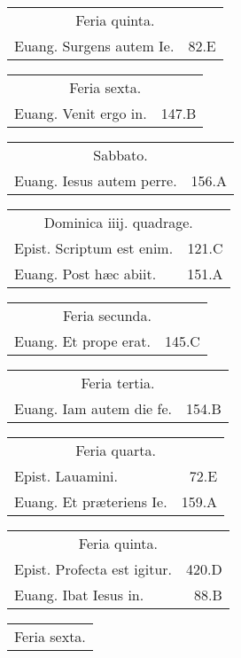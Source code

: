 \documentclass[a5paper,10pt]{book}
\def\ae{æ}
\begin{document}
\begin{multicols}{2}
\begin{tabular}{l r}
\end{tabular}
\begin{tabular}{l r}
\multicolumn{2}{c}{\color{red} Feria quinta.}\\
Euang. Surgens autem Ie. & 82.E\\
\end{tabular}
\begin{tabular}{l r}
\multicolumn{2}{c}{\color{red} Feria sexta.}\\
Euang. Venit ergo in. & 147.B\\
\end{tabular}
\begin{tabular}{l r}
\multicolumn{2}{c}{\color{red} Sabbato.}\\
Euang. Iesus autem perre. & 156.A\\
\end{tabular}
\begin{tabular}{l r}
\multicolumn{2}{c}{\color{red} Dominica iiij. quadrage.}\\
Epist. Scriptum est enim. & 121.C\\
Euang. Post h\ae c abiit. & 151.A\\
\end{tabular}
\begin{tabular}{l r}
\multicolumn{2}{c}{\color{red} Feria secunda.}\\
Euang. Et prope erat. & 145.C\\
\end{tabular}
\begin{tabular}{l r}
\multicolumn{2}{c}{\color{red} Feria tertia.}\\
Euang. Iam autem die fe. & 154.B\\
\end{tabular}
\begin{tabular}{l r}
\multicolumn{2}{c}{\color{red} Feria quarta.}\\
Epist. Lauamini. & 72.E\\
Euang. Et pr\ae teriens Ie. & 159.A\\
\end{tabular}
\begin{tabular}{l r}
\multicolumn{2}{c}{\color{red} Feria quinta.}\\
Epist. Profecta est igitur. & 420.D\\
Euang. Ibat Iesus in. & 88.B\\
\end{tabular}
\begin{tabular}{l r}
\multicolumn{2}{c}{\color{red} Feria sexta.}\\

\end{tabular}
\end{multicols}
\end{document}
